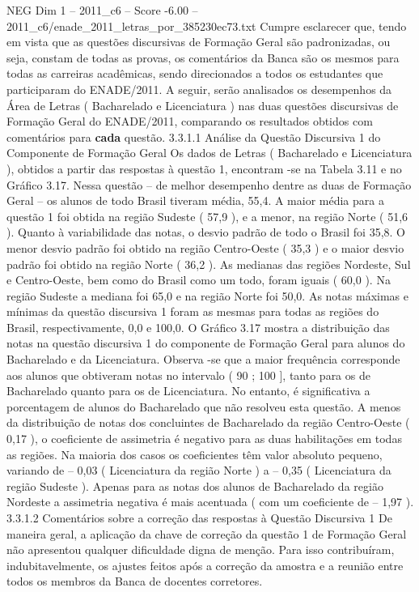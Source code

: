 \begin{textsample}{NEG Dim 1 – 2011\_c6 – Score -6.00 – 2011\_c6/enade\_2011\_letras\_por\_385230ec73.txt}
Cumpre esclarecer que, tendo em vista que as questões discursivas de Formação Geral são padronizadas, ou seja, constam de todas as provas, os comentários da Banca são os mesmos para todas as carreiras acadêmicas, sendo direcionados a todos os estudantes que participaram do ENADE/2011.
A seguir, serão analisados os desempenhos da Área de Letras ( Bacharelado e Licenciatura ) nas duas questões discursivas de Formação Geral do ENADE/2011, comparando os resultados obtidos com comentários para \textbf{cada} questão. 3.3.1.1 Análise da Questão Discursiva 1 do Componente de Formação Geral Os dados de Letras ( Bacharelado e Licenciatura ), obtidos a partir das respostas à questão 1, encontram -se na Tabela 3.11 e no Gráfico 3.17.
Nessa questão – de melhor desempenho dentre as duas de Formação Geral – os alunos de todo Brasil tiveram média, 55,4.
A maior média para a questão 1 foi obtida na região Sudeste ( 57,9 ), e a menor, na região Norte ( 51,6 ).
Quanto à variabilidade das notas, o desvio padrão de todo o Brasil foi 35,8.
O menor desvio padrão foi obtido na região Centro-Oeste ( 35,3 ) e o maior desvio padrão foi obtido na região Norte ( 36,2 ).
As medianas das regiões Nordeste, Sul e Centro-Oeste, bem como do Brasil como um todo, foram iguais ( 60,0 ).
Na região Sudeste a mediana foi 65,0 e na região Norte foi 50,0.
As notas máximas e mínimas da questão discursiva 1 foram as mesmas para todas as regiões do Brasil, respectivamente, 0,0 e 100,0.
O Gráfico 3.17 mostra a distribuição das notas na questão discursiva 1 do componente de Formação Geral para alunos do Bacharelado e da Licenciatura.
Observa -se que a maior frequência corresponde aos alunos que obtiveram notas no intervalo ( 90 ; 100 ], tanto para os de Bacharelado quanto para os de Licenciatura.
No entanto, é significativa a porcentagem de alunos do Bacharelado que não resolveu esta questão.
A menos da distribuição de notas dos concluintes de Bacharelado da região Centro-Oeste ( 0,17 ), o coeficiente de assimetria é negativo para as duas habilitações em todas as regiões.
Na maioria dos casos os coeficientes têm valor absoluto pequeno, variando de – 0,03 ( Licenciatura da região Norte ) a – 0,35 ( Licenciatura da região Sudeste ).
Apenas para as notas dos alunos de Bacharelado da região Nordeste a assimetria negativa é mais acentuada ( com um coeficiente de – 1,97 ). 3.3.1.2 Comentários sobre a correção das respostas à Questão Discursiva 1 De maneira geral, a aplicação da chave de correção da questão 1 de Formação Geral não apresentou qualquer dificuldade digna de menção.
Para isso contribuíram, indubitavelmente, os ajustes feitos após a correção da amostra e a reunião entre todos os membros da Banca de docentes corretores.

\end{textsample}
